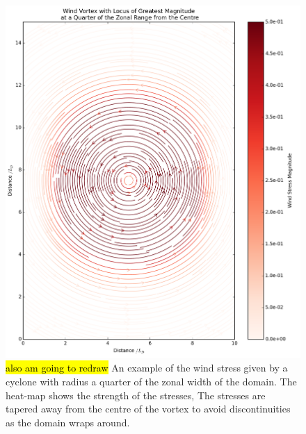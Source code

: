\documentclass[12pt,a4paper]{report}
\begin{document}
\begin{figure}
	\centering
	\includegraphics[width=\linewidth]{WindStressEg}
	\caption{\hl{also am going to redraw} An example of the wind stress given by a cyclone with
		radius a quarter of the zonal width of the domain. 
		The heat-map shows the strength of the stresses, 
		The  stresses are tapered away from the centre of the vortex to
		avoid discontinuities as the domain wraps around. }
	\label{fig:WindEg}
\end{figure}
\end{document}
